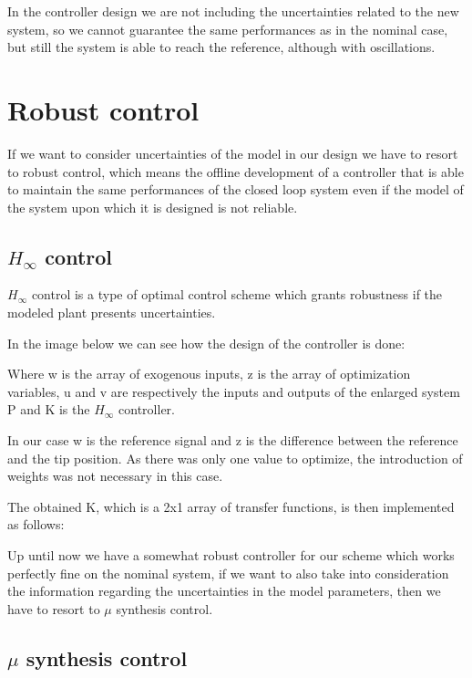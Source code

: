In the controller design we are not including the uncertainties related to the new system, so we cannot guarantee the same performances as in the nominal case, but still the system is able to reach the reference, although with oscillations.

\section{Robust control}

If we want to consider uncertainties of the model in our design we have to resort to robust control, which means the offline development of a controller that is able to maintain the same performances of the closed loop system even if the model of the system upon which it is designed is not reliable.

\subsection{$H_\infty$ control}

$H_\infty$ control is a type of optimal control scheme which grants robustness if the modeled plant presents uncertainties.

In the image below we can see how the design of the controller is done:


 Where w is the array of exogenous inputs, z is the array of optimization variables, u and v are respectively the inputs and outputs of the enlarged system P and K is the $H_\infty$ controller. 

 In our case w is the reference signal and z is the difference between the reference and the tip position.
 As there was only one value to optimize, the introduction of weights was not necessary in this case.

 The obtained K, which is a 2x1 array of transfer functions, is then implemented as follows:


Up until now we have a somewhat robust controller for our scheme which works perfectly fine on the nominal system, if we want to also take into consideration the information regarding the uncertainties in the model parameters, then we have to resort to $\mu$ synthesis control.

\subsection{$\mu$ synthesis control}

